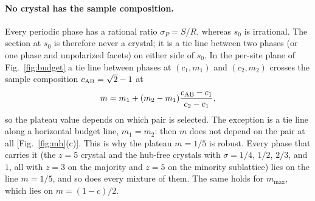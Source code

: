 \documentclass[aps,prb,twocolumn,superscriptaddress,floatfix]{revtex4-2}
\begin{document}
\paragraph*{No crystal has the sample composition.} Every periodic phase has a rational ratio $\sigma_P=S/R$, whereas $s_0$ is irrational. The section at $s_0$ is therefore never a crystal; it is a tie line between two phases (or one phase and unpolarized facets) on either side of $s_0$. In the per-site plane of Fig.~\ref{fig:budget} a tie line between phases at $(c_1,m_1)$ and $(c_2,m_2)$ crosses the sample composition $c_{\rm AB}=\sqrt2-1$ at
\begin{equation}
m=m_1+(m_2-m_1)\frac{c_{\rm AB}-c_1}{c_2-c_1},
\label{eq:tie}
\end{equation}
so the plateau value depends on which pair is selected. The exception is a tie line along a horizontal budget line, $m_1=m_2$: then $m$ does not depend on the pair at all [Fig.~\ref{fig:mh}(c)]. This is why the plateau $m=1/5$ is robust. Every phase that carries it (the $z=5$ crystal and the hub-free crystals with $\sigma=1/4$, $1/2$, $2/3$, and $1$, all with $z=3$ on the majority and $z=5$ on the minority sublattice) lies on the line $m=1/5$, and so does every mixture of them. The same holds for $m_{\max}$, which lies on $m=(1-c)/2$.
\end{document}
